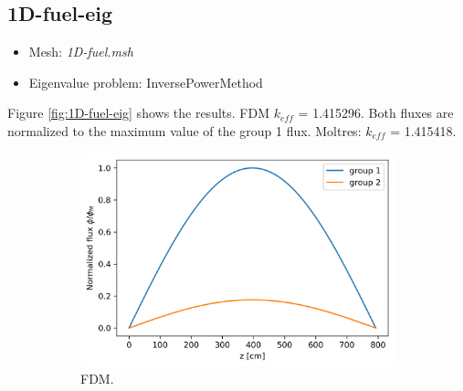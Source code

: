 \documentclass[11pt,letterpaper]{article}
\begin{document}
\subsection{1D-fuel-eig}

	\begin{itemize}
		\item Mesh: \textit{1D-fuel.msh}
		\item Eigenvalue problem: InversePowerMethod
	\end{itemize}

Figure \ref{fig:1D-fuel-eig} shows the results. 
FDM $k_{eff}$ = 1.415296. Both fluxes are normalized to the maximum value of the group 1 flux.
Moltres: $k_{eff}$ = 1.415418.

	\begin{figure}[htbp!]
		\centering
		\begin{subfigure}[t]{0.4\textwidth}
			\centering
			\includegraphics[width=\linewidth]{1D-fuel-eig-FDM}
			\caption{FDM.}
		\end{subfigure}
		\begin{subfigure}[t]{0.4\textwidth}
			\centering

\end{subfigure}
\end{figure}
\end{document}
